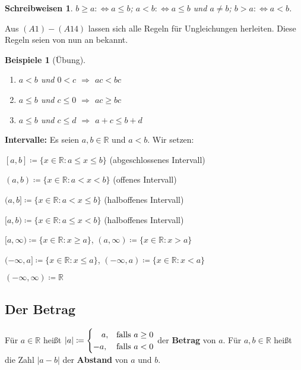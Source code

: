 \documentclass[12pt]{extreport} %
\newcommand{\R}{\mathbb{R}}
\theoremstyle{named}
\theoremstyle{itshape}
\theoremstyle{normal}
\newtheorem*{beispiele}{Beispiele}
\newtheorem*{schreibweisen}{Schreibweisen}
\begin{document}
\begin{schreibweisen}
$b \geq a :\iff a \leq b$; $a < b :\iff a \leq b$ und $a \neq b$; $b > a :\iff a < b$.
\end{schreibweisen}

Aus $(A1)-(A14)$ lassen sich alle Regeln für Ungleichungen herleiten. Diese Regeln seien von nun an bekannt.


\begin{beispiele}[Übung] ~\
	\begin{enumerate}
		\item $a < b$ und $0 < c$ $\Rightarrow$ $ac < bc$
		\item $a \leq b$ und $c \leq 0$ $\Rightarrow$ $ac \geq bc$
		\item $a \leq b$ und $c \leq d$ $\Rightarrow$ $a + c \leq b + d$
	\end{enumerate}
\end{beispiele}

\textbf{Intervalle:} Es seien  $a, b \in \R$ und $a < b$. Wir setzen:
\begin{description} \addtolength{\itemindent}{0.4cm}
	\item $[a, b] \coloneqq \{ x \in \R : a \leq x \leq b \}$ (abgeschlossenes Intervall) 
	\item $(a, b) \coloneqq \{ x \in \R : a < x < b \}$ (offenes Intervall)
	\item $(a, b] \coloneqq \{ x \in \R : a < x \leq b \}$ (halboffenes Intervall)
	\item $[a, b) \coloneqq \{ x \in \R : a \leq x < b \}$ (halboffenes Intervall)
	\item $[a, \infty) \coloneqq \{ x \in \R : x \geq a \}$, $(a , \infty) \coloneqq \{ x \in \R : x > a \}$
	\item $(-\infty, a] \coloneqq \{ x \in \R : x \leq a\}$, $(-\infty, a) \coloneqq \{ x \in \R : x < a\}$ 
	\item $(- \infty, \infty) \coloneqq \R$
\end{description}

\subsection*{Der Betrag} 
Für $a \in \R$ hei{\ss}t $|a| \coloneqq \begin{cases} \hspace{0.35cm} a, & \text{falls } a \geq 0 \\ -a, & \text{falls } a < 0\end{cases}$ 
der \textbf{Betrag} von $a$. F\"ur $a,b \in \R$ hei{\ss}t die Zahl $|a-b|$ der \textbf{Abstand} von $a$ und $b$.
\end{document}
